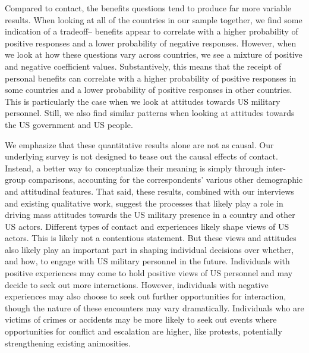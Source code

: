 Compared to contact, the benefits questions tend to produce far more variable results. When looking at all of the countries in our sample together, we find some indication of a tradeoff-- benefits appear to correlate with a higher probability of positive responses and a lower probability of negative responses. However, when we look at how these questions vary across countries, we see a mixture of positive and negative coefficient values. Substantively, this means that the receipt of personal benefits can correlate with a higher probability of positive responses in some countries and a lower probability of positive responses in other countries. This is particularly the case when we look at attitudes towards US military personnel. Still, we also find similar patterns when looking at attitudes towards the US government and US people.

We emphasize that these quantitative results alone are not as causal. Our underlying survey is not designed to tease out the causal effects of contact. Instead, a better way to conceptualize their meaning is simply through inter-group comparisons, accounting for the correspondents' various other demographic and attitudinal features. That said, these results, combined with our interviews and existing qualitative work, suggest the processes that likely play a role in driving mass attitudes towards the US military presence in a country and other US actors. Different types of contact and experiences likely shape views of US actors. This is likely not a contentious statement. But these views and attitudes also likely play an important part in shaping individual decisions over whether, and how, to engage with US military personnel in the future. Individuals with positive experiences may come to hold positive views of US personnel and may decide to seek out more interactions. However, individuals with negative experiences may also choose to seek out further opportunities for interaction, though the nature of these encounters may vary dramatically. Individuals who are victims of crimes or accidents may be more likely to seek out events where opportunities for conflict and escalation are higher, like protests, potentially strengthening existing animosities. 



